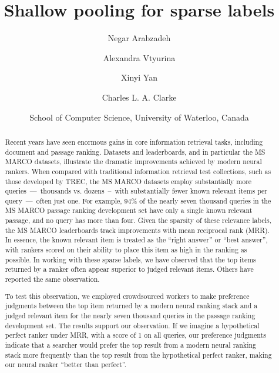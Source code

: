 \documentclass[fullpage]{article}
\begin{document}
\title{Shallow pooling for sparse labels}

\author{
  Negar Arabzadeh
  \and Alexandra Vtyurina
  \and Xinyi Yan
  \and Charles L. A. Clarke
}
\date{}

\date{School of Computer Science, University of Waterloo, Canada}

\maketitle

\begin{abstract}
Recent years have seen enormous gains in core information retrieval tasks, including document and passage ranking. Datasets and leaderboards, and in particular the MS MARCO datasets, illustrate the dramatic improvements achieved by modern neural rankers. When compared with traditional information retrieval test collections, such as those developed by TREC, the MS MARCO datasets employ substantially more queries~---~thousands vs. dozens~--~with substantially fewer known relevant items per query~---~often just one. For example, 94\% of the nearly seven thousand queries in the MS MARCO passage ranking development set have only a single known relevant passage, and no query has more than four. Given the sparsity of these relevance labels, the MS MARCO leaderboards track improvements with mean reciprocal rank (MRR). In essence, the known relevant item is treated as the ``right answer'' or ``best answer'', with rankers scored on their ability to place this item as high in the ranking as possible. In working with these sparse labels, we have observed that the top items returned by a ranker often appear superior to judged relevant items. Others have reported the same observation.

To test this observation, we employed crowdsourced workers to make preference judgments between the top item returned by a modern neural ranking stack and a judged relevant item for the nearly seven thousand queries in the passage ranking development set. The results support our observation. If we imagine a hypothetical perfect ranker under MRR, with a score of 1 on all queries, our preference judgments indicate that a searcher would prefer the top result from a modern neural ranking stack more frequently than the top result from the hypothetical perfect ranker, making our neural ranker ``better than perfect''.


\end{abstract}
\end{document}
